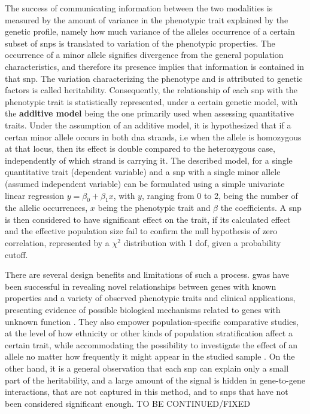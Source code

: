 The success of communicating information between the two modalities is measured by the amount of variance in the phenotypic trait explained by the genetic profile, namely how much variance of the alleles occurrence of a certain subset of \acp{snp} is translated to variation of the phenotypic properties. The occurrence of a minor allele signifies divergence from the general population characteristics, and therefore its presence implies that information is contained in that \ac{snp}. The variation characterizing the phenotype and is attributed to genetic factors is called heritability.  Consequently, the relationship of each \ac{snp} with the phenotypic trait is statistically represented, under a certain genetic model, with the \textbf{additive model} being the one primarily used when assessing quantitative traits. Under the assumption of an additive model, it is hypothesized that if a certan minor allele occurs in both \ac{dna} strands, i.e when the allele is homozygous at that locus, then its effect is double compared to the heterozygous case, independently of which strand is carrying it. The described model, for a single quantitative trait (dependent variable) and a \ac{snp} with a single minor allele (assumed independent variable) can be formulated using a simple univariate linear regression $y = \beta_0 + \beta_1 x$, with $y$, ranging from 0 to 2, being the number of the allelic occurrences, $x$ being the phenotypic trait and $\beta$ the coefficients. A \ac{snp} is then considered to have significant effect on the trait, if its calculated effect and the effective population size fail to confirm the null hypothesis of zero correlation, represented by a $\chi^2$ distribution with 1 \ac{dof}, given a probability cutoff.

There are several design benefits and limitations of such a process. \ac{gwas} have been successful in revealing novel relationships between genes with known properties and a variety of observed phenotypic traits and clinical applications, presenting evidence of possible biological mechanisms related to genes with unknown function \cite{Tam2019}. They also empower population-specific comparative studies, at the level of how ethnicity or other kinds of population stratification affect a certain trait, while accommodating the possibility to investigate the effect of an allele no matter how frequently it might appear in the studied sample \cite{Tam2019}. On the other hand, it is a general observation that each \ac{snp} can explain only a small part of the heritability, and a large amount of the signal is hidden in gene-to-gene interactions, that are not captured in this method, and to \acp{snp} that have not been considered significant enough. TO BE CONTINUED/FIXED



